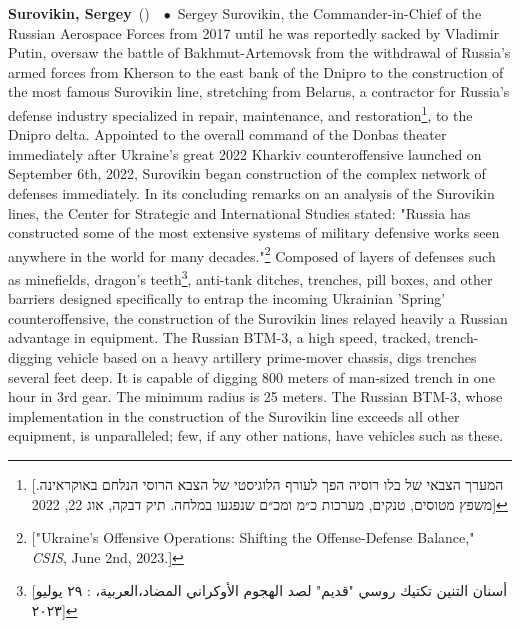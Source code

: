 \documentclass[10pt,a4paper,twoside]{article} %
\newcommand{\entry}[4]{\markboth{#1}{#1}\textbf{#1}\ {(#2)}\ \textit{#3}\ $\bullet$\ {#4}}  %
\begin{document}
\begin{multicols}{2}
\entry{Surovikin, Sergey} {} {} {Sergey Surovikin, the Commander-in-Chief of the Russian Aerospace Forces from 2017 until he was reportedly sacked by Vladimir Putin, oversaw the battle of Bakhmut-Artemovsk from the withdrawal of Russia's armed forces from Kherson to the east bank of the Dnipro to the construction of the most famous Surovikin line, stretching from Belarus, a contractor for Russia's defense industry specialized in repair, maintenance, and restoration\footnote{[\texthebrew{המערך הצבאי של בלו רוסיה הפך לעורף הלוגיסטי של הצבא הרוסי הנלחם באוקראינה. משפץ מטוסים, טנקים, מערכות כ״מ ומכ״ם שנפגעו במלחה. תיק דבקה, אוג 22, 2022}]}, to the Dnipro delta. Appointed to the overall command of the Donbas theater immediately after Ukraine's great 2022 Kharkiv counteroffensive launched on September 6th, 2022, Surovikin began construction of the complex network of defenses immediately. In its concluding remarks on an analysis of the Surovikin lines, the Center for Strategic and International Studies stated: "Russia has constructed some of the most extensive systems of military defensive works seen anywhere in the world for many decades."\footnote{["Ukraine’s Offensive Operations: Shifting the Offense-Defense Balance," \emph{CSIS}, June 2nd, 2023.]} Composed of layers of defenses such as minefields, dragon's teeth\footnote{[\textarabic{أسنان التنين تكتيك روسي "قديم" لصد الهجوم الأوكراني المضاد،العربية،  : ٢٩ يوليو ٢٠٢٣}]}, anti-tank ditches, trenches, pill boxes, and other barriers designed specifically to entrap the incoming Ukrainian 'Spring' counteroffensive, the construction of the Surovikin lines relayed heavily a Russian advantage in equipment. The Russian BTM-3, a high speed, tracked, trench-digging vehicle based on a heavy artillery prime-mover chassis, digs trenches several feet deep. It is capable of digging 800 meters of man-sized trench in one hour in 3rd gear. The minimum radius is 25 meters. The Russian BTM-3, whose implementation in the construction of the Surovikin line exceeds all other equipment, is unparalleled; few, if any other nations, have vehicles such as these. 
}
\end{multicols}
\end{document}
